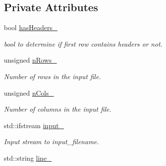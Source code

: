 \subsection*{Private Attributes}
\begin{DoxyCompactItemize}
\item 
\hypertarget{classCsvParser_abd8b856c78fe3ce8b32f1e6b0a390c84}{bool \hyperlink{classCsvParser_abd8b856c78fe3ce8b32f1e6b0a390c84}{has\-Headers\-\_\-}}\label{classCsvParser_abd8b856c78fe3ce8b32f1e6b0a390c84}

\begin{DoxyCompactList}\small\item\em bool to determine if first row contains headers or not. \end{DoxyCompactList}\item 
\hypertarget{classCsvParser_a646e6783ca009681d11cdd80148c50c2}{unsigned \hyperlink{classCsvParser_a646e6783ca009681d11cdd80148c50c2}{n\-Rows\-\_\-}}\label{classCsvParser_a646e6783ca009681d11cdd80148c50c2}

\begin{DoxyCompactList}\small\item\em Number of rows in the input file. \end{DoxyCompactList}\item 
\hypertarget{classCsvParser_ab12394b6deff7073d7182fc5a1b3d942}{unsigned \hyperlink{classCsvParser_ab12394b6deff7073d7182fc5a1b3d942}{n\-Cols\-\_\-}}\label{classCsvParser_ab12394b6deff7073d7182fc5a1b3d942}

\begin{DoxyCompactList}\small\item\em Number of columns in the input file. \end{DoxyCompactList}\item 
\hypertarget{classCsvParser_a418665bb33ded4f1ce88bedb60e3ffc0}{std\-::ifstream \hyperlink{classCsvParser_a418665bb33ded4f1ce88bedb60e3ffc0}{input\-\_\-}}\label{classCsvParser_a418665bb33ded4f1ce88bedb60e3ffc0}

\begin{DoxyCompactList}\small\item\em Input stream to {\itshape input\-\_\-filename}. \end{DoxyCompactList}\item 
\hypertarget{classCsvParser_aaeb353f8e1c649830268cfa5635eaa4f}{std\-::string \hyperlink{classCsvParser_aaeb353f8e1c649830268cfa5635eaa4f}{line\-\_\-}}\label{classCsvParser_aaeb353f8e1c649830268cfa5635eaa4f}


\end{DoxyCompactItemize}
